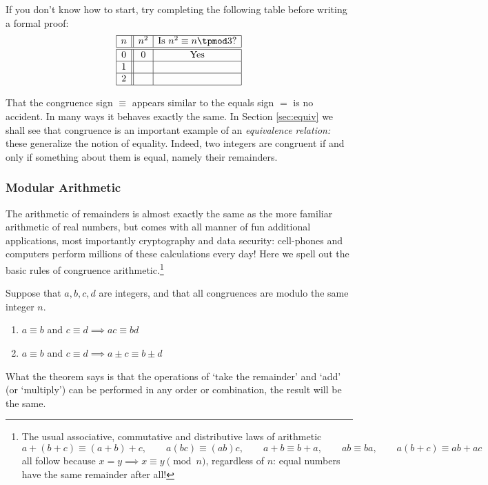 \noindent If you don't know how to start, try completing the following table before writing a formal proof:
\[\begin{array}{|c||c|c|}\hline
n&n^2&\text{Is }n^2\equiv n\tpmod 3\text{?}\\\hline\hline
0&0&\text{Yes}\\\hline
1&&\\\hline
2&&\\\hline
\end{array}\]\vspace*{3pt}

That the congruence sign $\equiv$ appears similar to the equals sign $=$ is no accident. In many ways it behaves exactly the same. In Section \ref{sec:equiv} we shall see that congruence is an important example of an \emph{equivalence relation:} these generalize the notion of equality. Indeed, two integers are congruent if and only if something about them is equal, namely their remainders.

\subsubsection*{Modular Arithmetic}

The arithmetic of remainders is almost exactly the same as the more familiar arithmetic of real numbers, but comes with all manner of fun additional applications, most importantly cryptography and data security: cell-phones and computers perform millions of these calculations every day! Here we spell out the basic rules of congruence arithmetic.\footnote{The usual associative, commutative and distributive laws of arithmetic
\[a+(b+c)\equiv (a+b)+c,\qquad a(bc)\equiv (ab)c,\qquad a+b\equiv b+a,\qquad ab\equiv ba,\qquad a(b+c)\equiv ab+ac\]
all follow because $x=y\implies x\equiv y\pmod n$, regardless of $n$: equal numbers have the same remainder after all!}

\begin{thm}\label{thm:congbasic}
Suppose that $a,b,c,d$ are integers, and that all congruences are modulo the same integer $n$. 
\begin{enumerate}\setlength{\itemsep}{0pt}
  \item $a\equiv b$ and $c\equiv d\implies ac\equiv bd$
  \item $a\equiv b$ and $c\equiv d\implies a\pm c\equiv b\pm d$
\end{enumerate}
\end{thm}

\noindent What the theorem says is that the operations of `take the remainder' and `add' (or `multiply') can be performed in any order or combination, the result will be the same.

